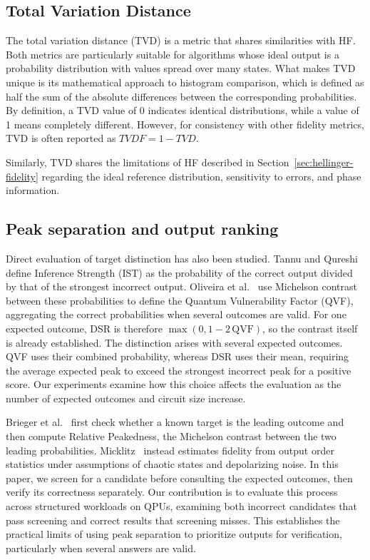\documentclass[pdflatex,sn-mathphys-num]{sn-jnl}
\theoremstyle{thmstyleone}%
\theoremstyle{thmstyletwo}%
\theoremstyle{thmstylethree}%
\begin{document}
\subsection{Total Variation Distance}

The total variation distance (TVD) \cite{knillBoundsApproximationTotal_1995, bhattacharyyaApproximatingTotalVariation_2023} is a metric that shares similarities with HF. Both metrics are particularly suitable for algorithms whose ideal output is a probability distribution with values spread over many states. What makes TVD unique is its mathematical approach to histogram comparison, which is defined as half the sum of the absolute differences between the corresponding probabilities. By definition, a TVD value of 0 indicates identical distributions, while a value of 1 means completely different. However, for consistency with other fidelity metrics, TVD is often reported as $TVDF = 1 - TVD$.

Similarly, TVD shares the limitations of HF described in Section~\ref{sec:hellinger-fidelity} regarding the ideal reference distribution, sensitivity to errors, and phase information.

\subsection{Peak separation and output ranking}\label{subsec:peak-related-work}

Direct evaluation of target distinction has also been studied. Tannu and Qureshi~\cite{tannuEnsembleDiverseMappings_2019} define Inference Strength (IST) as the probability of the correct output divided by that of the strongest incorrect output. Oliveira et al.~\cite{oliveiraQuFI_2022} use Michelson contrast between these probabilities to define the Quantum Vulnerability Factor (QVF), aggregating the correct probabilities when several outcomes are valid. For one expected outcome, DSR is therefore $\max(0,1-2\,\mathrm{QVF})$, so the contrast itself is already established. The distinction arises with several expected outcomes. QVF uses their combined probability, whereas DSR uses their mean, requiring the average expected peak to exceed the strongest incorrect peak for a positive score. Our experiments examine how this choice affects the evaluation as the number of expected outcomes and circuit size increase.

Brieger et al.~\cite{briegerPeakedRandomCircuits_2026} first check whether a known target is the leading outcome and then compute Relative Peakedness, the Michelson contrast between the two leading probabilities. Micklitz~\cite{micklitzOutputOrderStatistics_2025} instead estimates fidelity from output order statistics under assumptions of chaotic states and depolarizing noise. In this paper, we screen for a candidate before consulting the expected outcomes, then verify its correctness separately. Our contribution is to evaluate this process across structured workloads on QPUs, examining both incorrect candidates that pass screening and correct results that screening misses. This establishes the practical limits of using peak separation to prioritize outputs for verification, particularly when several answers are valid.
\end{document}
